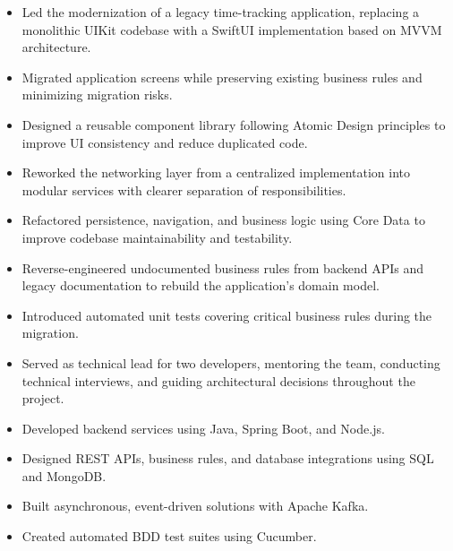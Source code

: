 \documentclass[10pt,a4paper]{article}
\begin{document}


\begin{itemize}
    \item Led the modernization of a legacy time-tracking application, replacing a monolithic UIKit codebase with a SwiftUI implementation based on MVVM architecture.
    \item Migrated application screens while preserving existing business rules and minimizing migration risks.
    \item Designed a reusable component library following Atomic Design principles to improve UI consistency and reduce duplicated code.
    \item Reworked the networking layer from a centralized implementation into modular services with clearer separation of responsibilities.
    \item Refactored persistence, navigation, and business logic using Core Data to improve codebase maintainability and testability.
    \item Reverse-engineered undocumented business rules from backend APIs and legacy documentation to rebuild the application's domain model.
    \item Introduced automated unit tests covering critical business rules during the migration.
    \item Served as technical lead for two developers, mentoring the team, conducting technical interviews, and guiding architectural decisions throughout the project.
\end{itemize}



\begin{itemize}
    \item Developed backend services using Java, Spring Boot, and Node.js.
    \item Designed REST APIs, business rules, and database integrations using SQL and MongoDB.
    \item Built asynchronous, event-driven solutions with Apache Kafka.
    \item Created automated BDD test suites using Cucumber.
\end{itemize}
\end{document}
